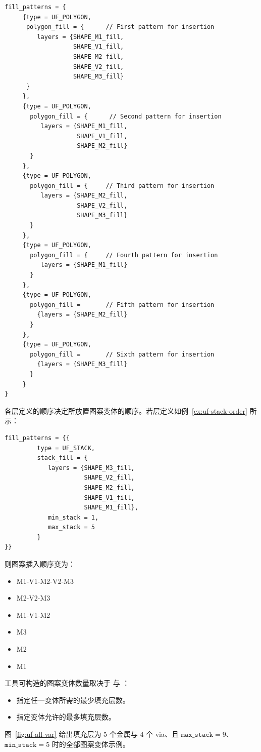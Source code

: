 \begin{lstlisting}[style=pxl,caption={使用 UF\_POLYGON 类型编写多个图案定义},label={ex:uf-equiv-poly}]
fill_patterns = {
     {type = UF_POLYGON,
      polygon_fill = {      // First pattern for insertion
         layers = {SHAPE_M1_fill,
                   SHAPE_V1_fill,
                   SHAPE_M2_fill,
                   SHAPE_V2_fill,
                   SHAPE_M3_fill}
      }
     },
     {type = UF_POLYGON,
       polygon_fill = {      // Second pattern for insertion
          layers = {SHAPE_M1_fill,
                    SHAPE_V1_fill,
                    SHAPE_M2_fill}
       }
     },
     {type = UF_POLYGON,
       polygon_fill = {     // Third pattern for insertion
          layers = {SHAPE_M2_fill,
                    SHAPE_V2_fill,
                    SHAPE_M3_fill}
       }
     },
     {type = UF_POLYGON,
       polygon_fill = {     // Fourth pattern for insertion
          layers = {SHAPE_M1_fill}
       }
     },
     {type = UF_POLYGON,
       polygon_fill =       // Fifth pattern for insertion
         {layers = {SHAPE_M2_fill}
       }
     },
     {type = UF_POLYGON,
       polygon_fill =       // Sixth pattern for insertion
         {layers = {SHAPE_M3_fill}
       }
     }
}
\end{lstlisting}

各层定义的顺序决定所放置图案变体的顺序。若层定义如例~\ref{ex:uf-stack-order} 所示：

\begin{lstlisting}[style=pxl,caption={各层定义顺序示例},label={ex:uf-stack-order}]
fill_patterns = {{
         type = UF_STACK,
         stack_fill = {
            layers = {SHAPE_M3_fill,
                      SHAPE_V2_fill,
                      SHAPE_M2_fill,
                      SHAPE_V1_fill,
                      SHAPE_M1_fill},
            min_stack = 1,
            max_stack = 5
         }
}}
\end{lstlisting}

则图案插入顺序变为：
\begin{itemize}
  \item M1-V1-M2-V2-M3
  \item M2-V2-M3
  \item M1-V1-M2
  \item M3
  \item M2
  \item M1
\end{itemize}

工具可构造的图案变体数量取决于  与 ：
\begin{itemize}
  \item {} 指定任一变体所需的最少填充层数。
  \item {} 指定变体允许的最多填充层数。
\end{itemize}
图~\ref{fig:uf-all-var} 给出填充层为 5 个金属与 4 个 via、且 $\texttt{max\_stack}=9$、$\texttt{min\_stack}=5$ 时的全部图案变体示例。

